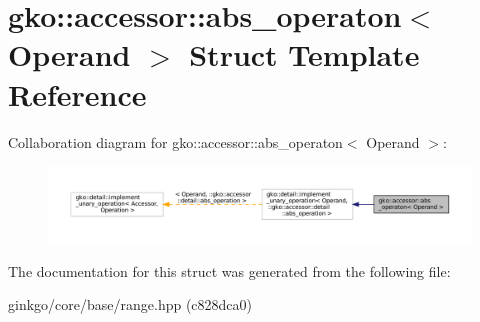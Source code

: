 \hypertarget{structgko_1_1accessor_1_1abs__operaton}{}\section{gko\+:\+:accessor\+:\+:abs\+\_\+operaton$<$ Operand $>$ Struct Template Reference}
\label{structgko_1_1accessor_1_1abs__operaton}


Collaboration diagram for gko\+:\+:accessor\+:\+:abs\+\_\+operaton$<$ Operand $>$\+:
\nopagebreak
\begin{figure}[H]
\begin{center}
\leavevmode
\includegraphics[width=350pt]{structgko_1_1accessor_1_1abs__operaton__coll__graph}
\end{center}
\end{figure}


The documentation for this struct was generated from the following file\+:\begin{DoxyCompactItemize}
\item 
ginkgo/core/base/range.\+hpp (c828dca0)\end{DoxyCompactItemize}
